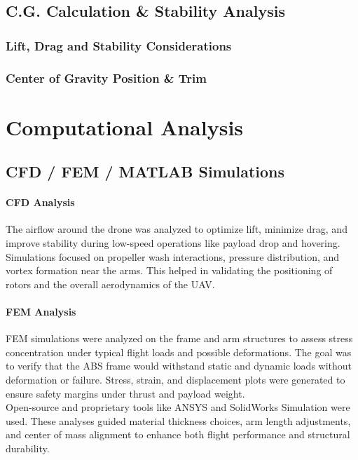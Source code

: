 \documentclass[12pt]{report}
\begin{document}
    \section{C.G. Calculation \& Stability Analysis}
      \subsection{Lift, Drag and Stability Considerations}
      \subsection{Center of Gravity Position \& Trim}

  \chapter{Computational Analysis}
    \section{CFD / FEM / MATLAB Simulations}
    \subsubsection{\large CFD Analysis}
    The airflow around the drone was analyzed to optimize lift, minimize drag, and improve stability during low-speed operations like payload drop and hovering. Simulations focused on propeller wash interactions, pressure distribution, and vortex formation near the arms. This helped in validating the positioning of rotors and the overall aerodynamics of the UAV.

    \subsubsection{\large FEM Analysis}
    FEM simulations were analyzed on the frame and arm structures to assess stress concentration under typical flight loads and possible deformations. The goal was to verify that the ABS frame would withstand static and dynamic loads without deformation or failure. Stress, strain, and displacement plots were generated to ensure safety margins under thrust and payload weight.\\

Open-source and proprietary tools like ANSYS and SolidWorks Simulation were used. These analyses guided material thickness choices, arm length adjustments, and center of mass alignment to enhance both flight performance and structural durability.
\end{document}
